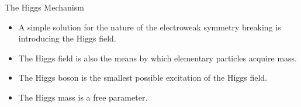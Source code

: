 
\begin{frame}{The Higgs Mechanism}
\begin{center}
  \begin{itemize}
  \item
    A simple solution for the nature of the electroweak symmetry breaking is introducing the Higgs field.
  \item
    The Higgs field is also the means by which elementary particles acquire mass.
  \item
    The Higgs boson is the smallest possible excitation of the Higgs field.
  \item
    The Higgs mass is a free parameter.
  \end{itemize}


\end{center}
\end{frame}

